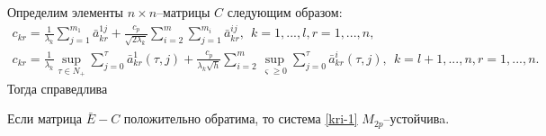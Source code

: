 Определим  элементы $n\times n$--матрицы $C$ следующим образом:
$$
\begin{array}{crl}
c_{kr} = \frac{1}{\lambda _k}\sum \limits_{j=1}^{m_1} \bar
a^{1j}_{kr} + \frac{c_p}{\sqrt{2\lambda _k}} \sum \limits_{i=2}^m
\sum \limits_{j=1}^{m_i} \bar a^{ij}_{kr}, \ \  k
= 1, ... ,l, r = 1, ..., n,\\
c_{kr} = \frac{1}{\lambda _k}\mathrel {\mathop {\sup}  \limits
_{\tau \in N_+ }} \sum \limits _{j=0 }^{\tau}\bar a^{1}_{kr}(\tau,j)
+ \frac{c_p}{\lambda _k\sqrt{h}} \sum \limits _{i=2}^{m}\mathrel
{\mathop {\sup}  \limits _{\varsigma \geq 0 }} \sum \limits _{j=0
}^{\tau} \bar a^{i}_{kr}(\tau,j), \ \ k = l+1, ...,n, r = 1, ..., n.
\end{array}
$$
Тогда справедлива

\begin{theorem}\label{kri-th4} Если матрица $\bar E - C$ положительно
обратима, то система \eqref{kri-1} $M_{2p}$--устой\-чивa.
\end{theorem}

